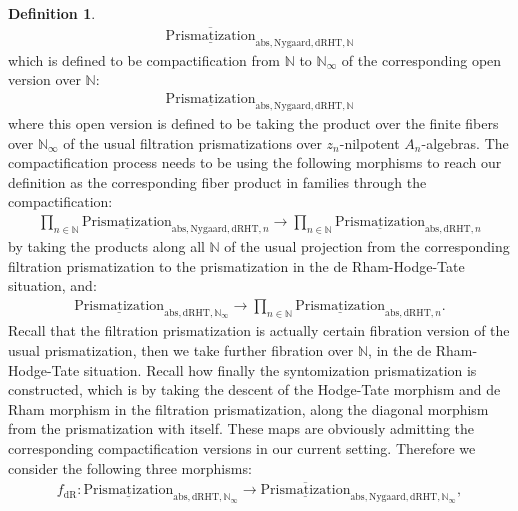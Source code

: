 \documentclass[12pt]{article}
\theoremstyle{definition}
\newtheorem{definition}{Definition}
\begin{document}
\begin{definition}
\begin{align}
\overline{\underline{\mathrm{Prismatization}}}_{\mathrm{abs},\mathrm{Nygaard},\mathrm{dRHT},\mathbb{N}}
\end{align}
which is defined to be compactification from $\mathbb{N}$ to $\mathbb{N}_\infty$ of the corresponding open version over $\mathbb{N}$:
\begin{align}
{\underline{\mathrm{Prismatization}}}_{\mathrm{abs},\mathrm{Nygaard},\mathrm{dRHT},\mathbb{N}}
\end{align}
where this open version is defined to be taking the product over the finite fibers over $\mathbb{N}_\infty$ of the usual filtration prismatizations over $z_n$-nilpotent $A_n$-algebras. The compactification process needs to be using the following morphisms to reach our definition as the corresponding fiber product in families through the compactification:
\begin{align}
\prod_{n\in \mathbb{N}} {\underline{\mathrm{Prismatization}}}_{\mathrm{abs},\mathrm{Nygaard},\mathrm{dRHT},n}\rightarrow  \prod_{n\in \mathbb{N}} {\underline{\mathrm{Prismatization}}}_{\mathrm{abs},\mathrm{dRHT},n}
\end{align}
by taking the products along all $\mathbb{N}$ of the usual projection from the corresponding filtration prismatization to the prismatization in the de Rham-Hodge-Tate situation, and:
\begin{align}
{\underline{\mathrm{Prismatization}}}_{\mathrm{abs},\mathrm{dRHT},\mathbb{N}_\infty}\rightarrow  \prod_{n\in \mathbb{N}} {\underline{\mathrm{Prismatization}}}_{\mathrm{abs},\mathrm{dRHT},n}.
\end{align}
Recall that the filtration prismatization is actually certain fibration version of the usual prismatization, then we take further fibration over $\mathbb{N}$, in the de Rham-Hodge-Tate situation. Recall how finally the syntomization prismatization is constructed, which is by taking the descent of the Hodge-Tate morphism and de Rham morphism in the filtration prismatization, along the diagonal morphism from the prismatization with itself. These maps are obviously admitting the corresponding compactification versions in our current setting. Therefore we consider the following three morphisms:
\begin{align}
f_\mathrm{dR}: {\underline{\mathrm{Prismatization}}}_{\mathrm{abs},\mathrm{dRHT},\mathbb{N}_\infty}\rightarrow \overline{\underline{\mathrm{Prismatization}}}_{\mathrm{abs},\mathrm{Nygaard},\mathrm{dRHT},\mathbb{N}_\infty},
\end{align}
\begin{align}

\end{align}
\end{definition}
\end{document}
